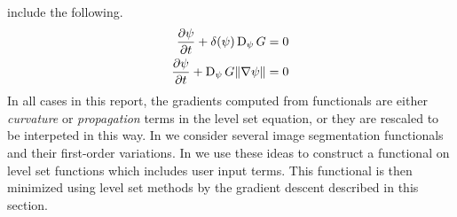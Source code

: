     include the following.
    \begin{align*}
        \frac{\partial \psi}{\partial t} + \delta(\psi) \operatorname{D}_\psi G & = 0
        \\
        \frac{\partial \psi}{\partial t} + \operatorname{D}_\psi G \|\nabla \psi\| & = 0
    \end{align*}
    In all cases in this report, the gradients computed from functionals
    are either \emph{curvature} or \emph{propagation} terms in the level set equation,
    or they are rescaled to be interpeted in this way. In  
     we consider
    several image segmentation functionals and their first-order variations.
    In  we use these ideas to construct a functional on
    level set functions which includes user input terms. This functional is
    then minimized using level set methods by the gradient descent described in this section.


